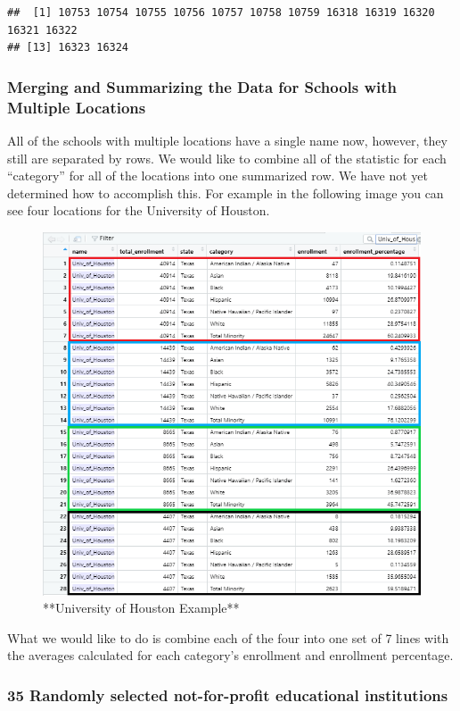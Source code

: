 \documentclass[
]{article}
\begin{document}
\begin{verbatim}
##  [1] 10753 10754 10755 10756 10757 10758 10759 16318 16319 16320 16321 16322
## [13] 16323 16324
\end{verbatim}

\hypertarget{merging-and-summarizing-the-data-for-schools-with-multiple-locations}{%
\subsubsection{Merging and Summarizing the Data for Schools with
Multiple
Locations}\label{merging-and-summarizing-the-data-for-schools-with-multiple-locations}}

All of the schools with multiple locations have a single name now,
however, they still are separated by rows. We would like to combine all
of the statistic for each ``category'' for all of the locations into one
summarized row. We have not yet determined how to accomplish this. For
example in the following image you can see four locations for the
University of Houston.

\begin{figure}
\includegraphics[width=0.75\linewidth]{Univ_of_Houston} \caption{**University of Houston Example**}\label{fig:pressure1}
\end{figure}

What we would like to do is combine each of the four into one set of 7
lines with the averages calculated for each category's enrollment and
enrollment percentage.

\hypertarget{randomly-selected-not-for-profit-educational-institutions}{%
\subsubsection{35 Randomly selected not-for-profit educational
institutions}\label{randomly-selected-not-for-profit-educational-institutions}}
\end{document}
